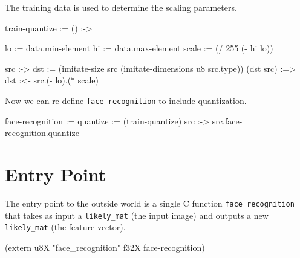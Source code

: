 \documentclass{article}
\newenvironment{likely}
{ \verbatim }
{ \endverbatim }
\begin{document}
The training data is used to determine the scaling parameters.

\begin{likely}
train-quantize :=
  () :->
  {
    lo := data.min-element
    hi := data.max-element
    scale := (/ 255 (- hi lo))

    src :->
    {
      dst := (imitate-size src (imitate-dimensions u8 src.type))
      (dst src) :=>
        dst :<- src.(- lo).(* scale)
    }
  }
\end{likely}

Now we can re-define \texttt{face-recognition} to include quantization.

\begin{likely}
face-recognition :=
{
  quantize := (train-quantize)
  src :->
    src.face-recognition.quantize
}
\end{likely}

\section{Entry Point}
The entry point to the outside world is a single C function \texttt{face\_recognition} that takes as input a \texttt{likely\_mat} (the input image) and outputs a new \texttt{likely\_mat} (the feature vector).

\begin{likely}
(extern u8X "face_recognition" f32X face-recognition)
\end{likely}
\end{document}
